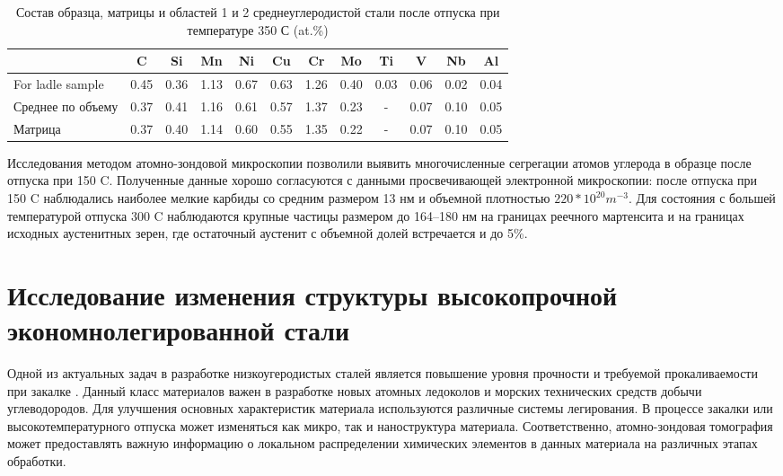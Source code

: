 \begin{table} [htbp]
	\centering
	\caption{Состав образца, матрицы и областей 1 и 2 среднеуглеродистой стали после отпуска при температуре 350 \textdegree С (at.\%)}%
	\label{tab:SteelComposition350}%
	\begin{SingleSpace}
		\begin{tabular}{|p{3cm}| c | c | c | c | c | c | c | c | c | c | c |}
			\hline
			& C & Si & Mn & Ni & Cu & Cr & Mo & Ti & V & Nb & Al     \\ \hline
			For ladle sample     & 0.45 & 0.36 & 1.13 & 0.67 & 0.63 & 1.26 & 0.40 & 0.03 & 0.06 & 0.02 & 0.04   \\ \hline
			Среднее по объему   & 0.37 & 0.41 & 1.16 & 0.61 & 0.57 & 1.37 & 0.23 & - & 0.07 & 0.10 & 0.05   \\  \hline		
			Матрица   & 0.37 & 0.40 & 1.14 & 0.60 & 0.55 & 1.35 & 0.22 & - & 0.07 & 0.10 & 0.05   \\  \hline		
		\end{tabular}%
	\end{SingleSpace}
\end{table}
\FloatBarrier
Исследования методом атомно-зондовой микроскопии позволили выявить многочисленные сегрегации атомов углерода в образце после отпуска при 150 \textdegree C. Полученные данные хорошо согласуются с данными просвечивающей электронной микроскопии: после отпуска при 150 \textdegree C наблюдались наиболее мелкие карбиды со средним размером 13 нм и объемной плотностью $220*10^{20} m^{-3}$. 
Для состояния  с большей температурой отпуска 300 \textdegree C наблюдаются крупные частицы размером до 164–180 нм на границах реечного мартенсита и на границах исходных аустенитных зерен, где остаточный аустенит с объемной долей встречается и до 5\%.

\FloatBarrier

\section{Исследование изменения структуры высокопрочной экономнолегированной стали}\label{sec:ch4/sect3}

Одной из актуальных задач в разработке низкоугеродистых сталей является повышение уровня прочности и требуемой прокаливаемости при закалке \cite{scbibGlubev}. Данный класс материалов важен в разработке новых атомных ледоколов и морских технических средств добычи углеводородов. Для улучшения основных характеристик материала используются различные системы легирования. В процессе закалки или высокотемпературного отпуска может изменяться как микро, так и наноструктура материала. Соответственно, атомно-зондовая томография может предоставлять важную информацию о локальном распределении химических элементов в данных материала на различных этапах обработки.

